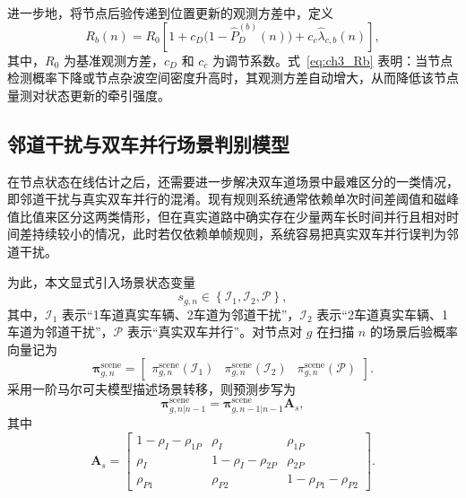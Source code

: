\documentclass{xdupgthesis}
\begin{document}
进一步地，将节点后验传递到位置更新的观测方差中，定义
\begin{equation}
	R_b(n)=R_0\left[1+c_D\bigl(1-\hat P_D^{(b)}(n)\bigr)+c_c\hat\lambda_{c,b}(n)\right],
	\label{eq:ch3_Rb}
\end{equation}
其中，$R_0$ 为基准观测方差，$c_D$ 和 $c_c$ 为调节系数。式~\eqref{eq:ch3_Rb} 表明：当节点检测概率下降或节点杂波空间密度升高时，其观测方差自动增大，从而降低该节点量测对状态更新的牵引强度。

\subsection{邻道干扰与双车并行场景判别模型}

在节点状态在线估计之后，还需要进一步解决双车道场景中最难区分的一类情况，即邻道干扰与真实双车并行的混淆。现有规则系统通常依赖单次时间差阈值和磁峰值比值来区分这两类情形，但在真实道路中确实存在少量两车长时间并行且相对时间差持续较小的情况，此时若仅依赖单帧规则，系统容易把真实双车并行误判为邻道干扰。

为此，本文显式引入场景状态变量
\begin{equation}
	s_{g,n}\in\left\{\mathcal I_1,\mathcal I_2,\mathcal P\right\},
	\label{eq:ch3_scene_state}
\end{equation}
其中，$\mathcal I_1$ 表示“1车道真实车辆、2车道为邻道干扰”，$\mathcal I_2$ 表示“2车道真实车辆、1车道为邻道干扰”，$\mathcal P$ 表示“真实双车并行”。对节点对 $g$ 在扫描 $n$ 的场景后验概率向量记为
\begin{equation}
	\boldsymbol\pi_{g,n}^{\mathrm{scene}}=
	\begin{bmatrix}
		\pi_{g,n}^{\mathrm{scene}}(\mathcal I_1) &
		\pi_{g,n}^{\mathrm{scene}}(\mathcal I_2) &
		\pi_{g,n}^{\mathrm{scene}}(\mathcal P)
	\end{bmatrix}.
	\label{eq:ch3_scene_vector}
\end{equation}
采用一阶马尔可夫模型描述场景转移，则预测步写为
\begin{equation}
	\boldsymbol\pi_{g,n|n-1}^{\mathrm{scene}}=
	\boldsymbol\pi_{g,n-1|n-1}^{\mathrm{scene}}\mathbf A_s,
	\label{eq:ch3_scene_predict}
\end{equation}
其中
\begin{equation}
	\mathbf A_s=
	\begin{bmatrix}
		1-\rho_I-\rho_{1P} & \rho_I & \rho_{1P}\\
		\rho_I & 1-\rho_I-\rho_{2P} & \rho_{2P}\\
		\rho_{P1} & \rho_{P2} & 1-\rho_{P1}-\rho_{P2}
	\end{bmatrix}.
	\label{eq:ch3_As}
\end{equation}
\end{document}
